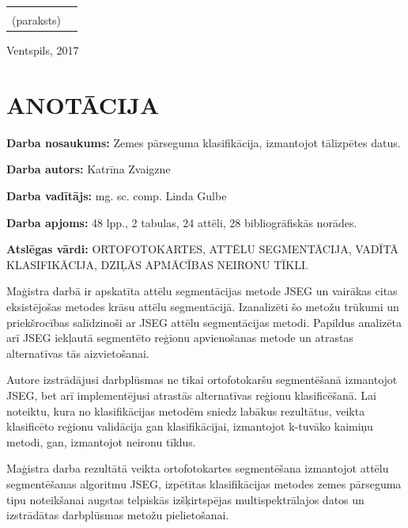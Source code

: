 \documentclass[12pt,paper=a4]{report}
\begin{document}
\begin{titlepage}
\begin{center}
\begin{tabular}{@{}r@{}l@{}}
{\mbox{}\hrulefill\vspace{-0.4em}\\
{\scriptsize(paraksts)}\vspace{2em}} \\
\end{tabular}
\vfill
Ventspils, 2017
\end{center}
\end{titlepage}
\setcounter{page}{2}

\chapter*{ANOTĀCIJA}
\textbf{Darba nosaukums:} Zemes pārseguma klasifikācija, izmantojot tālizpētes datus.\par
\textbf{Darba autors:} Katrīna Zvaigzne\par
\textbf{Darba vadītājs:} mg. sc. comp. Linda Gulbe\par
\textbf{Darba apjoms:} 48 lpp., 2 tabulas, 24 attēli, 28 bibliogrāfiskās norādes.\par
\textbf{Atslēgas vārdi:} ORTOFOTOKARTES, ATTĒLU SEGMENTĀCIJA, VADĪTĀ KLASIFIKĀCIJA, DZIĻĀS APMĀCĪBAS NEIRONU TĪKLI. \\ \par
Maģistra darbā ir apskatīta attēlu segmentācijas metode JSEG un vairākas citas eksistējošas metodes krāsu attēlu segmentācijā. Izanalizēti šo metožu trūkumi un priekšrocības salīdzinoši ar JSEG attēlu segmentācijas metodi. Papildus analizēta arī JSEG iekļautā segmentēto reģionu apvienošanas metode un atrastas alternatīvas tās aizvietošanai.\par
Autore izstrādājusi darbplūsmas ne tikai ortofotokaršu segmentēšanā izmantojot JSEG, bet arī implementējusi atrastās alternatīvas reģionu klasificēšanā. Lai noteiktu, kura no klasifikācijas metodēm sniedz labākus rezultātus, veikta klasificēto reģionu validācija gan klasifikācijai, izmantojot k-tuvāko kaimiņu metodi, gan, izmantojot neironu tīklus.\par
Maģistra darba rezultātā veikta ortofotokartes segmentēšana izmantojot attēlu segmentēšanas algoritmu JSEG, izpētītas klasifikācijas metodes zemes pārseguma tipu noteikšanai augstas telpiskās izšķirtspējas multispektrālajos datos un izstrādātas darbplūsmas metožu pielietošanai. 
\end{document}
